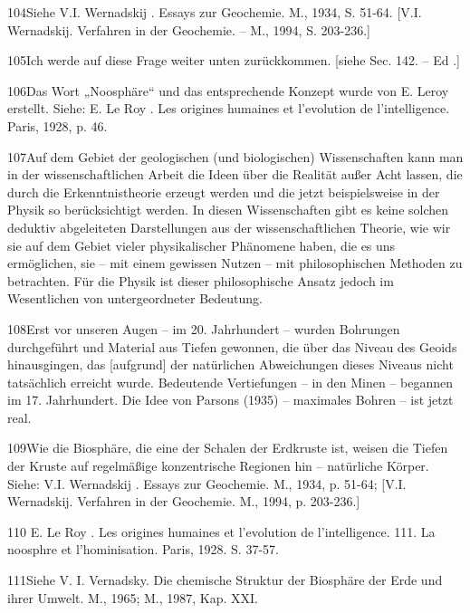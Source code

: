 \documentclass[11pt,a4paper]{book}
\begin{document}
104Siehe V.I. Wernadskij . Essays zur Geochemie. M., 1934, S. 51-64. [V.I. Wernadskij. Verfahren in der Geochemie. -- M., 1994, S. 203-236.]



105Ich werde auf diese Frage weiter unten zurückkommen. [siehe Sec. 142. -- Ed .]



106Das Wort „Noosphäre“ und das entsprechende Konzept wurde von E. Leroy erstellt. Siehe: E. Le Roy . Les origines humaines et l'evolution de l'intelligence. Paris, 1928, p. 46.



107Auf dem Gebiet der geologischen (und biologischen) Wissenschaften kann man in der wissenschaftlichen Arbeit die Ideen über die Realität außer Acht lassen, die durch die Erkenntnistheorie erzeugt werden und die jetzt beispielsweise in der Physik so berücksichtigt werden. In diesen Wissenschaften gibt es keine solchen deduktiv abgeleiteten Darstellungen aus der wissenschaftlichen Theorie, wie wir sie auf dem Gebiet vieler physikalischer Phänomene haben, die es uns ermöglichen, sie -- mit einem gewissen Nutzen -- mit philosophischen Methoden zu betrachten. Für die Physik ist dieser philosophische Ansatz jedoch im Wesentlichen von untergeordneter Bedeutung.



108Erst vor unseren Augen -- im 20. Jahrhundert -- wurden Bohrungen durchgeführt und Material aus Tiefen gewonnen, die über das Niveau des Geoids hinausgingen, das [aufgrund] der natürlichen Abweichungen dieses Niveaus nicht tatsächlich erreicht wurde. Bedeutende Vertiefungen -- in den Minen -- begannen im 17. Jahrhundert. Die Idee von Parsons (1935) -- maximales Bohren -- ist jetzt real.



109Wie die Biosphäre, die eine der Schalen der Erdkruste ist, weisen die Tiefen der Kruste auf regelmäßige konzentrische Regionen hin -- natürliche Körper. Siehe: V.I. Wernadskij . Essays zur Geochemie. M., 1934, p. 51-64; [V.I. Wernadskij. Verfahren in der Geochemie. M., 1994, p. 203-236.]



110 E. Le Roy . Les origines humaines et l'evolution de l'intelligence. 111. La noosphre et l'hominisation. Paris, 1928. S. 37-57.



111Siehe V. I. Vernadsky. Die chemische Struktur der Biosphäre der Erde und ihrer Umwelt. M., 1965; M., 1987, Kap. XXI.
\end{document}
